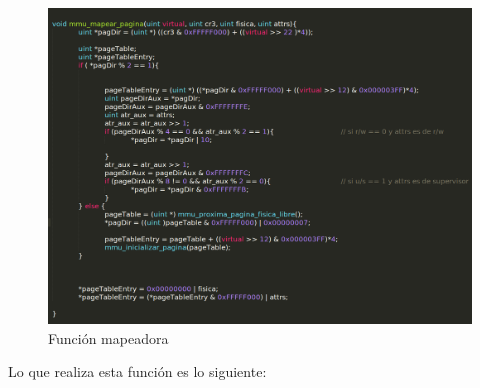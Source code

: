 \begin{figure}[H]
\begin{center}
\includegraphics[width=\linewidth]{ejercicio3/mappag.png}
\caption{{\small Función mapeadora} }
\endminipage
\end{center}
\end{figure}

Lo que realiza esta función es lo siguiente: 

